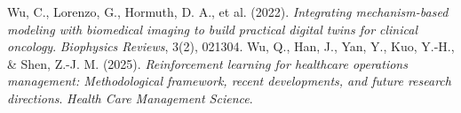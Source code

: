 \documentclass[10pt,a4paper]{article}
\begin{document}
\begin{thebibliography}{99}
Wu, C., Lorenzo, G., Hormuth, D. A., et al. (2022).  
\textit{Integrating mechanism-based modeling with biomedical imaging to build practical digital twins for clinical oncology}.  
\textit{Biophysics Reviews}, 3(2), 021304.
Wu, Q., Han, J., Yan, Y., Kuo, Y.-H., \& Shen, Z.-J. M. (2025).  
\textit{Reinforcement learning for healthcare operations management: Methodological framework, recent developments, and future research directions}.  
\textit{Health Care Management Science}.

\end{thebibliography}
\end{document}
